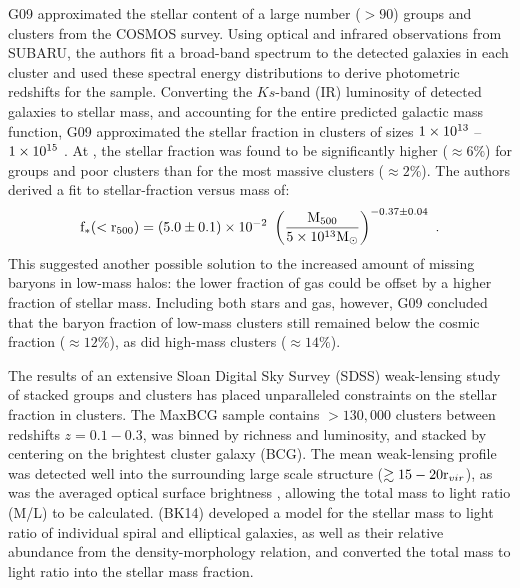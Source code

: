 G09 approximated the stellar content of a large number ($>90$) groups
and clusters from the COSMOS survey. Using optical and infrared
observations from SUBARU, the authors fit a broad-band spectrum to the
detected galaxies in each cluster and used these spectral energy
distributions to derive photometric redshifts for the
sample. Converting the $Ks$-band (IR) luminosity of detected galaxies to stellar
mass, and accounting for the entire predicted galactic mass function,
G09 approximated the stellar fraction in clusters of sizes
$1\times 10^{13}$ -- $1\times 10^{15}$ \Msun. At \rfive{}, the stellar fraction
was found to be significantly higher ($\approx 6\%$) for groups and
poor clusters than for the most massive clusters ($\approx 2\%$). The
authors derived a fit to stellar-fraction versus mass of:
\begin{equation}
\textrm{f}_{*}(<\textrm{r\ensuremath{_{500}}}{}) =
(5.0\pm0.1)\times 10^{-2}~\left(\frac{\textrm{M\ensuremath{_{500}}}}{5\times 10^{13}\textrm{M}_\odot}\right)^{-0.37\pm0.04}~. \nonumber
\end{equation}
This suggested another possible solution to the increased amount of
missing baryons in low-mass halos: the lower fraction of gas could be
offset by a higher fraction of stellar mass. Including both stars and
gas, however, G09 concluded that the baryon fraction of low-mass
clusters still remained below the cosmic fraction ($\approx 12\%$), as
did high-mass clusters ($\approx 14\%$). 

The results of an extensive Sloan Digital Sky Survey (SDSS)
weak-lensing study of stacked groups and clusters has placed
unparalleled constraints on the stellar fraction in clusters. The
MaxBCG sample \citep{Sheldon2009a} contains $> 130,000$ clusters
between redshifts $z = 0.1-0.3$, was binned by richness and
luminosity, and stacked by centering on the brightest cluster galaxy
(BCG). The mean weak-lensing profile was detected well into the
surrounding large scale structure ($\gtrsim 15-20 \textrm{r\ensuremath{_{vir}}}$), as was the
averaged optical surface brightness \citep{Sheldon2009b}, allowing the
total mass to light ratio (M/L) to be calculated. \citet{Bahcall2014} (BK14)
developed a model for the stellar mass to light ratio of individual
spiral and elliptical galaxies, as well as their relative abundance
from the density-morphology relation, and converted the total mass to
light ratio into the stellar mass fraction. 

